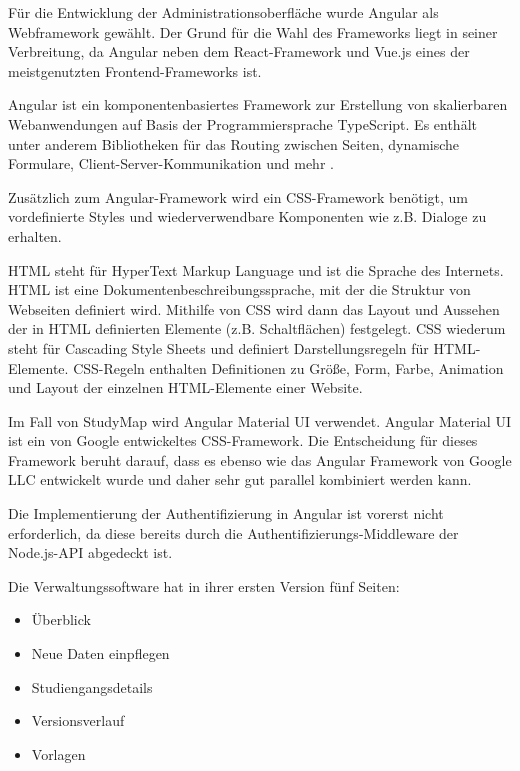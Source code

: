 Für die Entwicklung der Administrationsoberfläche wurde Angular als Webframework gewählt. Der Grund für die Wahl des Frameworks liegt in seiner Verbreitung, da Angular neben dem React-Framework und Vue.js eines der meistgenutzten Frontend-Frameworks ist. \parencite{greif_state_2022}

Angular ist ein komponentenbasiertes Framework zur Erstellung von skalierbaren Webanwendungen auf Basis der Programmiersprache TypeScript. Es enthält unter anderem Bibliotheken für das Routing zwischen Seiten, dynamische Formulare, Client-Server-Kommunikation und mehr \parencite{google_inc_angular_2023}. 

Zusätzlich zum Angular-Framework wird ein CSS-Framework benötigt, um vordefinierte Styles und wiederverwendbare Komponenten wie z.B. Dialoge zu erhalten.

HTML steht für HyperText Markup Language und ist die Sprache des Internets. HTML ist eine Dokumentenbeschreibungssprache, mit der die Struktur von Webseiten definiert wird. Mithilfe von CSS wird dann das Layout und Aussehen der in HTML definierten Elemente (z.B. Schaltflächen) festgelegt. \parencite{mozilla_corporation_html_2023} CSS wiederum steht für Cascading Style Sheets und definiert Darstellungsregeln für HTML-Elemente. CSS-Regeln enthalten Definitionen zu Größe, Form, Farbe, Animation und Layout der einzelnen HTML-Elemente einer Website. \parencite{mozilla_corporation_what_2024}

Im Fall von StudyMap wird Angular Material UI verwendet. Angular Material UI ist ein von Google entwickeltes CSS-Framework. Die Entscheidung für dieses Framework beruht darauf, dass es ebenso wie das Angular Framework von Google LLC entwickelt wurde und daher sehr gut parallel kombiniert werden kann. \parencite{google_llc_angular_2024}

Die Implementierung der Authentifizierung in Angular ist vorerst nicht erforderlich, da diese bereits durch die Authentifizierungs-Middleware der Node.js-API abgedeckt ist.

\noindent
Die Verwaltungssoftware hat in ihrer ersten Version fünf Seiten:
\begin{itemize}
    \item Überblick
    \item Neue Daten einpflegen
    \item Studiengangsdetails
    \item Versionsverlauf
    \item Vorlagen
\end{itemize}

